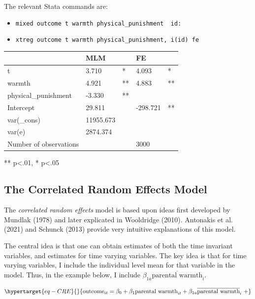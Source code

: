 \documentclass[
  letterpaper,
  DIV=11,
  numbers=noendperiod]{scrreprt}
\providecommand{\tightlist}{%
  \setlength{\itemsep}{0pt}\setlength{\parskip}{0pt}}\usepackage{longtable,booktabs,array}
\begin{document}
The relevant Stata commands are:

\begin{itemize}
\tightlist
\item
  \texttt{mixed\ outcome\ t\ warmth\ physical\_punishment\ \textbar{}\textbar{}\ id:}
\item
  \texttt{xtreg\ outcome\ t\ warmth\ physical\_punishment,\ i(id)\ fe}
\end{itemize}

\begin{longtable}[]{@{}lllll@{}}
\toprule()
& MLM & & FE & \\
\midrule()
\endhead
t & 3.710 & * & 4.093 & * \\
warmth & 4.921 & ** & 4.883 & ** \\
physical\_punishment & -3.330 & ** & & \\
Intercept & 29.811 & & -298.721 & ** \\
var(\_cons) & 11955.673 & & & \\
var(e) & 2874.374 & & & \\
Number of observations & & & 3000 & \\
\bottomrule()
\end{longtable}

** p\textless.01, * p\textless.05

\hypertarget{the-correlated-random-effects-model}{%
\subsection{The Correlated Random Effects
Model}\label{the-correlated-random-effects-model}}

The \emph{correlated random effects} model is based upon ideas first
developed by Mundlak (1978) and later explicated in Wooldridge (2010).
Antonakis et al. (2021) and Schunck (2013) provide very intuitive
explanations of this model.

The central idea is that one can obtain estimates of both the time
invariant variables, and estimates for time varying variables. The key
idea is that for time varying variables, I include the individual level
mean for that variable in the model. Thus, in the example below, I
include \(\beta_{1a}\overline{\text{parental warmth}}_{i}\).

\begin{equation}\protect\hypertarget{eq-CRE}{}{\text{outcome}_{it} = \beta_0 + \beta_1 \text{parental warmth}_{it} + \beta_{1a}\overline{\text{parental warmth}}_{i} \ + }\label{eq-CRE}\end{equation}
\end{document}
